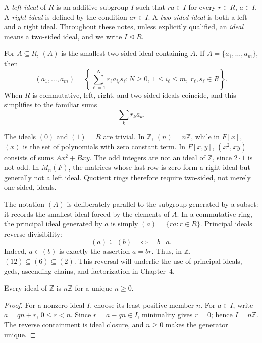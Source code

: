 \begin{definition}
A \emph{left ideal} of \(R\) is an additive subgroup \(I\) such that
\(ra\in I\) for every \(r\in R\), \(a\in I\).  A \emph{right ideal} is
defined by the condition \(ar\in I\).  A \emph{two-sided ideal} is both a
left and a right ideal.  Throughout these notes, unless explicitly
qualified, an \emph{ideal} means a two-sided ideal, and we write
\(I\trianglelefteq R\).

For \(A\subseteq R\), \((A)\) is the smallest two-sided ideal containing
\(A\).  If \(A=\{a_1,\ldots,a_m\}\), then
\[(a_1,\ldots,a_m)=
\left\{\sum_{\ell=1}^N r_\ell a_{i_\ell}s_\ell:
N\ge0,\ 1\le i_\ell\le m,\ r_\ell,s_\ell\in R\right\}.\]
When \(R\) is commutative, left, right, and two-sided ideals coincide, and
this simplifies to the familiar sums
\[
\sum_k r_ka_k.
\]
\end{definition}

The ideals \((0)\) and \((1)=R\) are trivial. In \(\mathbb Z\),
\((n)=n\mathbb Z\), while in \(F[x]\), \((x)\) is the set of polynomials
with zero constant term. In \(F[x,y]\), \((x^2,xy)\) consists of sums
\(Ax^2+Bxy\). The odd integers are not an ideal of \(\mathbb Z\), since
\(2\cdot1\) is not odd.  In \(M_n(F)\), the matrices whose last row is zero
form a right ideal but generally not a left ideal.  Quotient rings therefore
require two-sided, not merely one-sided, ideals.

The notation \((A)\) is deliberately parallel to the subgroup generated by
a subset: it records the smallest ideal forced by the elements of \(A\).
In a commutative ring, the principal ideal generated by \(a\) is simply
\((a)=\{ra:r\in R\}\).  Principal ideals reverse divisibility:
\[(a)\subseteq(b)\quad\Longleftrightarrow\quad b\mid a.\]
Indeed, \(a\in(b)\) is exactly the assertion \(a=br\).  Thus, in
\(\mathbb Z\), \((12)\subseteq(6)\subseteq(2)\).  This reversal will
underlie the use of principal ideals, gcds, ascending chains, and
factorization in Chapter~4.

\begin{proposition}
Every ideal of \(\mathbb Z\) is \(n\mathbb Z\) for a unique \(n\ge0\).
\end{proposition}
\begin{proof}
For a nonzero ideal \(I\), choose its least positive member \(n\). For
\(a\in I\), write \(a=qn+r\), \(0\le r<n\). Since \(r=a-qn\in I\),
minimality gives \(r=0\); hence \(I=n\mathbb Z\). The reverse containment
is ideal closure, and \(n\ge0\) makes the generator unique.
\end{proof}

